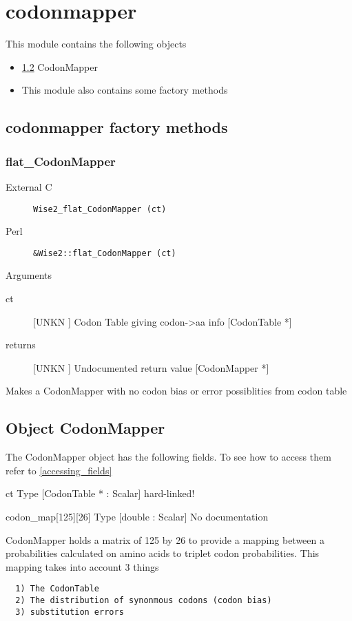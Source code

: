 \section{codonmapper}
\label{module_codonmapper}
This module contains the following objects

\begin{itemize}
\item \ref{object_CodonMapper} CodonMapper

\item This module also contains some factory methods
\end{itemize}
\subsection{codonmapper factory methods}
\subsubsection{flat_CodonMapper}
\begin{description}
\item[External C] {\tt Wise2_flat_CodonMapper (ct)}
\item[Perl] {\tt &Wise2::flat_CodonMapper (ct)}

\end{description}
Arguments
\begin{description}
\item[ct] [UNKN ] Codon Table giving codon->aa info [CodonTable *]
\item[returns] [UNKN ] Undocumented return value [CodonMapper *]
\end{description}
Makes a CodonMapper with no codon bias
or error possiblities from codon table






\subsection{Object CodonMapper}

\label{object_CodonMapper}

The CodonMapper object has the following fields. To see how to access them refer to \ref{accessing_fields}
\begin{description}
\item{ct} Type [CodonTable * : Scalar]  hard-linked!

\item{codon_map[125][26]} Type [double : Scalar] No documentation

\end{description}
CodonMapper holds a matrix of 125 by 26
to provide a mapping between a probabilities
calculated on amino acids to triplet codon
probabilities. This mapping takes into account
3 things
\begin{verbatim}
  1) The CodonTable
  2) The distribution of synonmous codons (codon bias)
  3) substitution errors


\end{verbatim}



